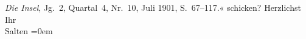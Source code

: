\begin{ledgroupsized}[t]{13cm}
{{{                        \emph{Die Insel}, Jg. 2, Quartal 4,
                     Nr. 10, Juli 1901, S. 67–117.}}}\label{K_L03316-1h}« schicken? \pend
           \pstart
           Herzlichst {\\[\baselineskip]}Ihr {\\[\baselineskip]}\spacefill\mbox{Salten}\pend
           \leftskip=0em{}
         
         \endnumbering{}\end{ledgroupsized}\begin{anhang}\end{anhang}\newcommand{\dateiname}{L03316}\newcommand{\titel}{Felix Salten an Arthur Schnitzler, 28. 7. 1901}\newcommand{\editorInnen}{Martin Anton Müller und Laura Untner}
      
